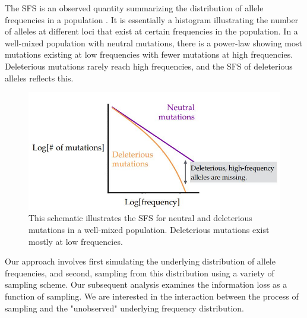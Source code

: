 The SFS is an observed quantity summarizing the distribution of allele frequencies in a population \cite{lapierre_accuracy_2017}. It is essentially a histogram illustrating the number of alleles at different loci that exist at certain frequencies in the population. In a well-mixed population with neutral mutations, there is a power-law showing most mutations existing at low frequencies with fewer mutations at high frequencies. Deleterious mutations rarely reach high frequencies, and the SFS of deleterious alleles reflects this.

\begin{figure}[H]
    \centering
    \includegraphics[scale=0.7]{img/sfs_schematic.JPG}
    \caption{This schematic illustrates the SFS for neutral and deleterious mutations in a well-mixed population. Deleterious mutations exist mostly at low frequencies.}
    \label{fig:sfs_schema}
\end{figure}


Our approach involves first simulating the underlying distribution of allele frequencies, and second, sampling from this distribution using a variety of sampling scheme. Our subsequent analysis examines the information loss as a function of sampling. We are interested in the interaction between the process of sampling and the "unobserved" underlying frequency distribution. 

